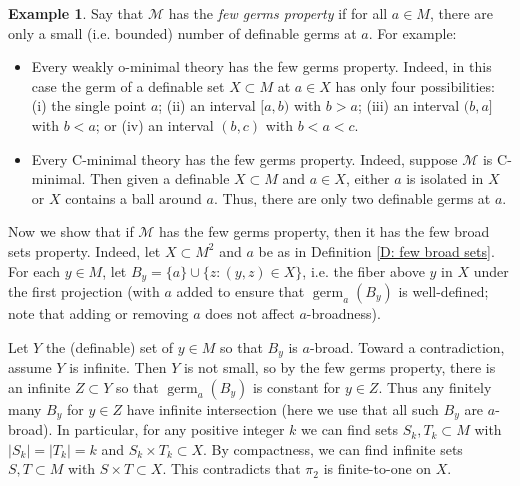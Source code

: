 \documentclass{amsart}
\theoremstyle{definition}
\newtheorem{example}[theorem]{Example}
\begin{document}
\begin{example}
    Say that $\mathcal M$ has the \textit{few germs property} if for all $a\in M$, there are only a small (i.e. bounded) number of definable germs at $a$. For example:
    \begin{itemize}
        \item Every weakly o-minimal theory has the few germs property. Indeed, in this case the germ of a definable set $X\subset M$ at $a\in X$ has only four possibilities: (i) the single point $a$; (ii) an interval $[a,b)$ with $b>a$; (iii) an interval $(b,a]$ with $b<a$; or (iv) an interval $(b,c)$ with $b<a<c$.
        \item Every C-minimal theory has the few germs property. Indeed, suppose $\mathcal M$ is C-minimal. Then given a definable $X\subset M$ and $a\in X$, either $a$ is isolated in $X$ or $X$ contains a ball around $a$. Thus, there are only two definable germs at $a$.
    \end{itemize}
    Now we show that if $\mathcal M$ has the few germs property, then it has the few broad sets property. Indeed, let $X\subset M^2$ and $a$ be as in Definition \ref{D: few broad sets}. For each $y\in M$, let $B_y=\{a\}\cup\{z:(y,z)\in X\}$, i.e. the fiber above $y$ in $X$ under the first projection (with $a$ added to ensure that $\operatorname{germ}_a(B_y)$ is well-defined; note that adding or removing $a$ does not affect $a$-broadness).
    
    Let $Y$ the (definable) set of $y\in M$ so that $B_y$ is $a$-broad. Toward a contradiction, assume $Y$ is infinite. Then $Y$ is not small, so by the few germs property, there is an infinite $Z\subset Y$ so that $\operatorname{germ}_a(B_y)$ is constant for $y\in Z$. Thus any finitely many $B_y$ for $y\in Z$ have infinite intersection (here we use that all such $B_y$ are $a$-broad). In particular, for any positive integer $k$ we can find sets $S_k,T_k\subset M$ with $|S_k|=|T_k|=k$ and $S_k\times T_k\subset X$. By compactness, we can find infinite sets $S,T\subset M$ with $S\times T\subset X$. This contradicts that $\pi_2$ is finite-to-one on $X$.
\end{example}
\end{document}
